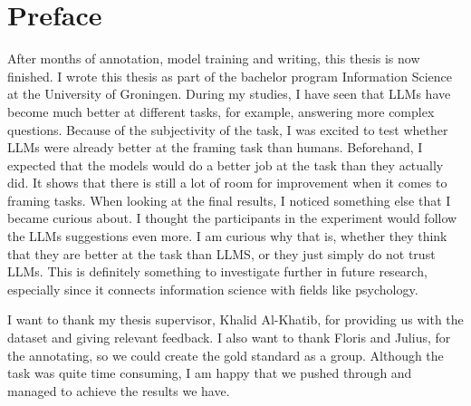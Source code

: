 \documentclass[
10pt, %
a4paper, %
oneside, %
headinclude,footinclude, %
] {book}%
\begin{document}






\chapter*{Preface}

After months of annotation, model training and writing, this thesis is now finished. I wrote this thesis as part of the bachelor program Information Science at the University of Groningen. During my studies, I have seen that LLMs have become much better at different tasks, for example, answering more complex questions. Because of the subjectivity of the task, I was excited to test whether LLMs were already better at the framing task than humans. Beforehand, I expected that the models would do a better job at the task than they actually did. It shows that there is still a lot of room for improvement when it comes to framing tasks.
When looking at the final results, I noticed something else that I became curious about. I thought the participants in the experiment would follow the LLMs suggestions even more. I am curious why that is, whether they think that they are better at the task than LLMS, or they just simply do not trust LLMs. This is definitely something to investigate further in future research, especially since it connects information science with fields like psychology.

I want to thank my thesis supervisor, Khalid Al-Khatib, for providing us with the dataset and giving relevant feedback. I also want to thank Floris and Julius, for the annotating, so we could create the gold standard as a group. Although the task was quite time consuming, I am happy that we pushed through and managed to achieve the results we have. 

\end{document}
